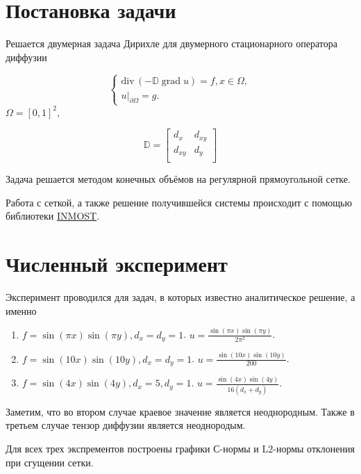\documentclass{article}
\DeclareMathOperator{\grad}{grad}
\newcommand{\divg}{\mathrm{div}\,}
\begin{document}
	
\section{Постановка задачи}
Решается двумерная задача Дирихле для двумерного стационарного оператора диффузии

$$
\begin{cases}
    \divg(-\mathbb{D} \grad u) = f, x \in \Omega, \\
    u|_{\partial \Omega} = g.
\end{cases}
$$
$
    \Omega = [0,1]^2,
$

\[
\mathbb{D}=
\begin{bmatrix}
	d_x & d_{xy} \\
	d_{xy} & d_y \\
\end{bmatrix}
\]

Задача решается методом конечных объёмов на регулярной прямоугольной сетке. 

Работа с сеткой, а также решение получившейся системы происходит с помощью библиотеки \href{https://github.com/INMOST-DEV/INMOST}{INMOST}.


\section{Численный эксперимент}

Эксперимент проводился для задач, в которых известно аналитическое решение, а именно
\begin{enumerate}
	\item $f = \sin(\pi x) \sin(\pi y), d_x = d_y = 1$. $u = \frac{\sin(\pi x) \sin(\pi y)}{2 \pi^2}$.
	\item $f = \sin(10 x) \sin(10 y), d_x = d_y = 1$. $u = \frac{\sin(10 x) \sin(10 y)}{200}$.
	\item $f = \sin(4 x) \sin(4 y), d_x = 5, d_y = 1$. $u = \frac{\sin(4 x) \sin(4 y)}{16(d_x + d_y)}$.
\end{enumerate}

Заметим, что во втором случае краевое значение является неоднородным. Также в третьем случае тензор диффузии является неоднородым.

Для всех трех экспрементов построены графики С-нормы и L2-нормы отклонения при сгущении сетки.
\end{document}
